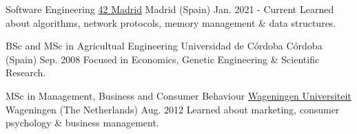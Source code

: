 
\begin{cventries}

  \cventry
    {Software Engineering} %
    {\href{https://42.fr/en/homepage/}{42 Madrid}} %
    {Madrid (Spain)} %
    {Jan. 2021 - Current} %
    {
      {Learned about algorithms, network protocols, memory management \& data structures.}
    }

  \cventry
    {BSc and MSc in Agricultual Engineering} %
    {Universidad de Córdoba} %
    {Córdoba (Spain)} %
    {Sep. 2008} %
    {
      {Focused in Economics, Genetic Engineering \& Scientific Research.}
    }

  \cventry
    {MSc in Management, Business and Consumer Behaviour} %
    {\href{https://www.wur.nl/en.htm}{Wageningen Universiteit}} %
    {Wageningen (The Netherlands)} %
    {Aug. 2012} %
    {
      {Learned about marketing, consumer psychology \& business management.}
    }


\end{cventries}
